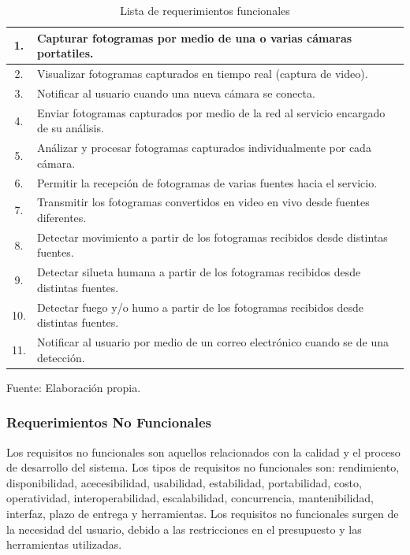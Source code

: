 \begin{table}[H]
    \caption{Lista de requerimientos funcionales }
    \label{tabla:req_funcionales}
    \begin{center}
        \begin{tabular}{ |c|l|} 
            \hline
            1. & Capturar fotogramas por medio de una o varias cámaras portatiles.\\ \hline
            2. & Visualizar fotogramas capturados en tiempo real (captura de video).\\  \hline
            3. & Notificar al usuario cuando una nueva cámara se conecta.\\  \hline
            4. & Enviar fotogramas capturados por medio de la red al servicio encargado de su análisis.\\ \hline
            5. & Análizar y procesar fotogramas capturados individualmente por cada cámara.\\  \hline
            6. & Permitir la recepción de fotogramas de varias fuentes hacia el servicio.\\ \hline
            7. & Transmitir los fotogramas convertidos en video en vivo desde fuentes diferentes.\\ \hline
            8. & Detectar movimiento a partir de los fotogramas recibidos desde distintas fuentes.\\ \hline
            9. & Detectar silueta humana a partir de los fotogramas recibidos desde distintas fuentes.\\ \hline
            10. & Detectar fuego y/o humo a partir de los fotogramas recibidos desde distintas fuentes.\\ \hline
            11. & Notificar al usuario por medio de un correo electrónico cuando se de una detección.\\ \hline
        \end{tabular}
    \end{center}
    \begin{center}
        Fuente: Elaboración propia.
    \end{center}
\end{table}

\subsubsection{Requerimientos No Funcionales}
Los requisitos no funcionales son aquellos relacionados con la calidad y el proceso de desarrollo del sistema. Los tipos de requisitos no funcionales son: rendimiento, disponibilidad, acecesibilidad, usabilidad, estabilidad, portabilidad, costo, operatividad, interoperabilidad, escalabilidad, concurrencia, mantenibilidad, interfaz, plazo de entrega y herramientas. Los requisitos no funcionales surgen de la necesidad del usuario, debido a las restricciones en el presupuesto y las herramientas utilizadas.\\

